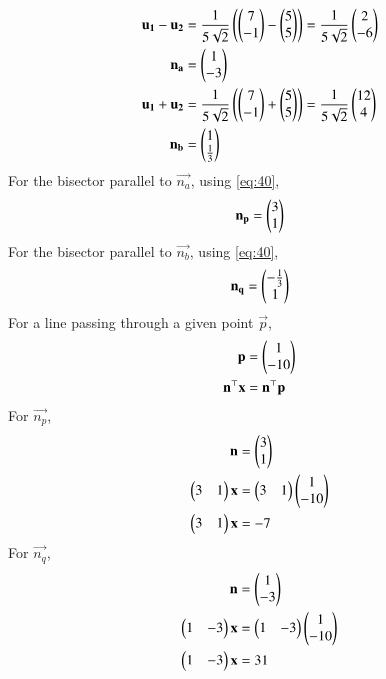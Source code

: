 \documentclass[journal]{IEEEtran}
\begin{document}
\begin{align}
    \mathbf{u_1} - \mathbf{u_2} &= \frac{1}{5\sqrt{2}}\left(\begin{pmatrix}7 \\ -1\end{pmatrix} - \begin{pmatrix}5 \\ 5\end{pmatrix}\right) = \frac{1}{5\sqrt{2}}\begin{pmatrix}2 \\ -6\end{pmatrix} \\
    \mathbf{n_a} &= \begin{pmatrix}1 \\ -3\end{pmatrix} \\
    \mathbf{u_1} + \mathbf{u_2} &= \frac{1}{5\sqrt{2}}\left(\begin{pmatrix}7 \\ -1\end{pmatrix} + \begin{pmatrix}5 \\ 5\end{pmatrix}\right) = \frac{1}{5\sqrt{2}}\begin{pmatrix}12 \\ 4\end{pmatrix} \\
    \mathbf{n_b} &= \begin{pmatrix}1 \\ \frac{1}{3}\end{pmatrix}
\end{align}
For the bisector parallel to $\vec{n_a}$, using \eqref{eq:40},
\begin{align}
    \mathbf{n_p} = \begin{pmatrix}3 \\ 1\end{pmatrix}
\end{align}
For the bisector parallel to $\vec{n_b}$, using \eqref{eq:40},
\begin{align}    
    \mathbf{n_q} = \begin{pmatrix}-\frac{1}{3} \\ 1\end{pmatrix}
\end{align}
For a line passing through a given point $\vec{p}$,
\begin{align}
    \mathbf{p} &= \begin{pmatrix}1 \\ -10\end{pmatrix} \\
    \mathbf{n}^\top\mathbf{x} &= \mathbf{n}^\top\mathbf{p}
\end{align}
For $\vec{n_p}$,
\begin{align}
    \mathbf{n} &= \begin{pmatrix}3 \\ 1\end{pmatrix} \\
    \begin{pmatrix}3 & 1\end{pmatrix}\mathbf{x} &= \begin{pmatrix}3 & 1\end{pmatrix}\begin{pmatrix}1 \\ -10\end{pmatrix} \\
	\begin{pmatrix}3 & 1\end{pmatrix}\mathbf{x} &= -7
\end{align}
For $\vec{n_q}$,
\begin{align}
    \mathbf{n} &= \begin{pmatrix}1 \\ -3\end{pmatrix} \\
    \begin{pmatrix}1 & -3\end{pmatrix}\mathbf{x} &= \begin{pmatrix}1 & -3\end{pmatrix}\begin{pmatrix}1 \\ -10\end{pmatrix} \\
    \begin{pmatrix}1 & -3\end{pmatrix}\mathbf{x} &= 31
\end{align}
\end{document}
